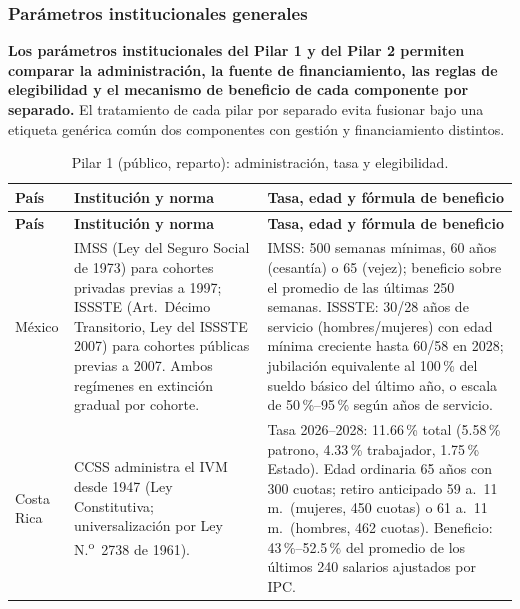\documentclass[12pt, letterpaper]{article}
\begin{document}
\subsubsection*{Parámetros institucionales generales}

\textbf{Los parámetros institucionales del Pilar 1 y del Pilar 2 permiten comparar la administración, la fuente de financiamiento, las reglas de elegibilidad y el mecanismo de beneficio de cada componente por separado.} El tratamiento de cada pilar por separado evita fusionar bajo una etiqueta genérica común dos componentes con gestión y financiamiento distintos.

\begin{xltabular}{\textwidth}{P{1.6cm}Y Y}
\caption{Pilar 1 (público, reparto): administración, tasa y elegibilidad.}
\label{tab:param_pilar1}\\
\toprule
\textbf{País} & \textbf{Institución y norma} & \textbf{Tasa, edad y fórmula de beneficio} \\
\midrule
\endfirsthead

\toprule
\textbf{País} & \textbf{Institución y norma} & \textbf{Tasa, edad y fórmula de beneficio} \\
\midrule
\endhead

\bottomrule
\endfoot

México &
IMSS (Ley del Seguro Social de 1973) para cohortes privadas previas a 1997; ISSSTE (Art.\ Décimo Transitorio, Ley del ISSSTE 2007) para cohortes públicas previas a 2007. Ambos regímenes en extinción gradual por cohorte. &
IMSS: 500 semanas mínimas, 60 años (cesantía) o 65 (vejez); beneficio sobre el promedio de las últimas 250 semanas. ISSSTE: 30/28 años de servicio (hombres/mujeres) con edad mínima creciente hasta 60/58 en 2028; jubilación equivalente al 100\,\% del sueldo básico del último año, o escala de 50\,\%--95\,\% según años de servicio. \\

Costa Rica &
CCSS administra el IVM desde 1947 (Ley Constitutiva; universalización por Ley N.\textsuperscript{o}~2738 de 1961). &
Tasa 2026--2028: 11.66\,\% total (5.58\,\% patrono, 4.33\,\% trabajador, 1.75\,\% Estado). Edad ordinaria 65 años con 300 cuotas; retiro anticipado 59 a.\ 11 m.\ (mujeres, 450 cuotas) o 61 a.\ 11 m.\ (hombres, 462 cuotas). Beneficio: 43\,\%--52.5\,\% del promedio de los últimos 240 salarios ajustados por IPC. \\


\end{xltabular}
\end{document}
